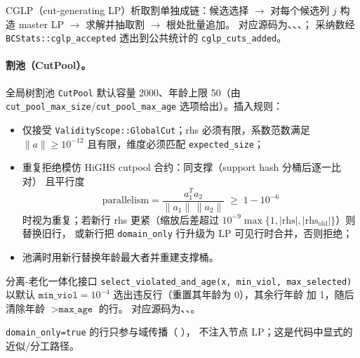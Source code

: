 CGLP（cut-generating LP）析取割单独成链：候选选择
$\to$ 对每个候选列 $j$ 构造 master LP $\to$ 求解并抽取割 $\to$ 根处批量追加。
对应源码为、、、；
采纳数经 \texttt{BCStats::cglp\_accepted} 透出到公共统计的
\texttt{cglp\_cuts\_added}。

\paragraph{割池（CutPool）。}
全局树割池 \texttt{CutPool} 默认容量 2000、年龄上限 50（由
\texttt{cut\_pool\_max\_size}/\texttt{cut\_pool\_max\_age} 选项给出）。插入规则：
\begin{itemize}
  \item 仅接受 \texttt{ValidityScope::GlobalCut}；rhs 必须有限，系数范数满足
        $\|a\|\ge 10^{-12}$ 且有限，维度必须匹配 \texttt{expected\_size}；
  \item 重复拒绝模仿 HiGHS cutpool 合约：同支撑（support hash 分桶后逐一比对）
        且平行度
        \begin{equation}
          \mathrm{parallelism}=\frac{a_1^{T}a_2}{\|a_1\|\,\|a_2\|}
          \;\ge\; 1-10^{-6}
        \end{equation}
        时视为重复；若新行 rhs 更紧（缩放后差超过
        $10^{-9}\max\{1,|\mathrm{rhs}|,|\mathrm{rhs}_{\mathrm{old}}|\}$）则替换旧行，
        或新行把 \texttt{domain\_only} 行升级为 LP 可见行时合并，否则拒绝；
  \item 池满时用新行替换年龄最大者并重建支撑桶。
\end{itemize}
分离-老化一体化接口 \texttt{select\_violated\_and\_age(x, min\_viol, max\_selected)}
以默认 $\texttt{min\_viol}=10^{-4}$ 选出违反行（重置其年龄为 0），其余行年龄
加 1，随后清除年龄 $>\texttt{max\_age}$ 的行。
对应源码为、、。

\texttt{domain\_only=true} 的行只参与域传播（
），
不注入节点 LP；这是代码中显式的近似/分工路径。

